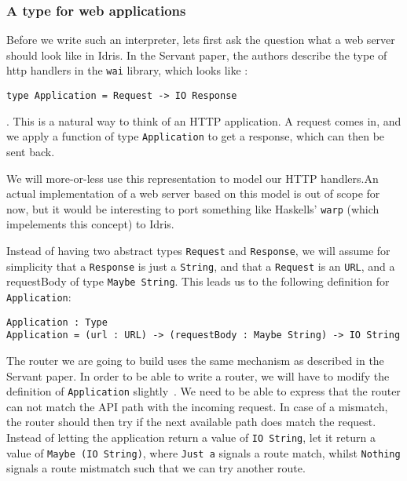 \documentclass[12pt,a4paper]{article}
\begin{document}
\subsubsection{A type for web applications}
Before we write such an interpreter, lets first ask the question what a web server should look like in Idris. In the Servant paper, the authors describe the type of http handlers in the \texttt{wai} library, which looks like \cite{servant}:
\begin{verbatim}
type Application = Request -> IO Response
\end{verbatim}.
This is a natural way to think of an HTTP application. A request comes in, and we apply a function of type \texttt{Application} to get a response, which can then be sent back.

We will more-or-less use this representation to model our HTTP handlers.An actual implementation of a web server based on this model is out of scope for now, but it would be interesting to port something like Haskells' \texttt{warp} (which impelements this concept) to Idris.

Instead of having two abstract types \texttt{Request} and \texttt{Response}, we will assume for simplicity that a \texttt{Response} is just a \texttt{String}, and that a \texttt{Request} is an \texttt{URL}, and a requestBody of type \texttt{Maybe String}. This leads us to the following definition for \texttt{Application}:

\begin{verbatim}
Application : Type
Application = (url : URL) -> (requestBody : Maybe String) -> IO String
\end{verbatim}

The router we are going to build uses the same mechanism as described in the Servant paper. In order to be able to write a router, we will have
to modify the definition of \texttt{Application} slightly~\cite{servant}. We need to be able to express that the router can not
match the API path with the incoming request. In case of a mismatch, the router should then try if the next available path does match the request.
Instead of letting the application return a value of \texttt{IO String}, let it return a value of \texttt{Maybe (IO String)}, where \texttt{Just a} signals a route match, whilst \texttt{Nothing} signals a route mistmatch such that we can try another route.
\end{document}

